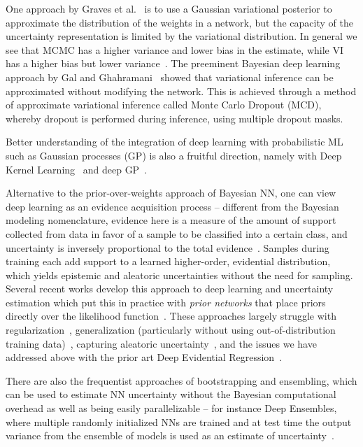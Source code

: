 \documentclass{article}
\begin{document}
One approach by Graves et al.~\cite{graves13} is to use a Gaussian variational posterior to approximate the distribution of the weights in a network, but the capacity of the uncertainty representation is limited by the variational distribution.
In general we see that MCMC has a higher variance and lower bias in the estimate, while VI has a higher bias but lower variance~\cite{mattei19}.
The preeminent Bayesian deep learning approach by Gal and Ghahramani~\cite{gal16} showed that variational inference can be approximated without modifying the network.
This is achieved through a method of approximate variational inference called Monte Carlo Dropout (MCD), whereby dropout is performed during inference, using multiple dropout masks.

Better understanding of the integration of deep learning with probabilistic ML such as Gaussian processes (GP) is also a fruitful direction, namely with Deep Kernel Learning~\cite{wilson15,lavin21} and deep GP~\cite{duvenaud14,dutordoir21}.

Alternative to the prior-over-weights approach of Bayesian NN, one can view deep learning as an evidence acquisition process -- different from the Bayesian modeling nomenclature, evidence here is a measure of the amount of support collected from data in favor of a sample to be classified into a certain class, and uncertainty is inversely proportional to the total evidence~\cite{sensoy18}.
Samples during training each add support to a learned higher-order, evidential distribution, which yields epistemic and aleatoric uncertainties without the need for sampling.
Several recent works develop this approach to deep learning and uncertainty estimation which put this in practice with \textit{prior networks} that place priors directly over the likelihood function~\cite{amini20,malinin18}.
These approaches largely struggle with regularization~\cite{sensoy18}, generalization (particularly without using out-of-distribution training data)~\cite{malinin18,hafner18}, capturing aleatoric uncertainty~\cite{gurevich19}, and the issues we have addressed above with the prior art Deep Evidential Regression~\cite{amini20}.

There are also the frequentist approaches of bootstrapping and ensembling, which can be used to estimate NN uncertainty without the Bayesian computational overhead as well as being easily parallelizable -- for instance Deep Ensembles, where multiple randomly initialized NNs are trained and at test time the output variance from the ensemble of models is used as an estimate of uncertainty~\cite{lakshminarayanan17}.
\end{document}
